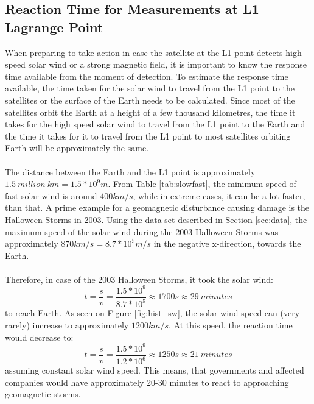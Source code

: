 \documentclass[12pt]{article}
\begin{document}
    \subsection{Reaction Time for Measurements at L1 Lagrange Point}
        When preparing to take action in case the satellite at the L1 point detects high speed solar wind or a strong magnetic field, it is important to know the response time available from the moment of detection. To estimate the response time available, the time taken for the solar wind to travel from the L1 point to the satellites or the surface of the Earth needs to be calculated. Since most of the satellites orbit the Earth at a height of a few thousand kilometres, the time it takes for the high speed solar wind to travel from the L1 point to the Earth and the time it takes for it to travel from the L1 point to most satellites orbiting Earth will be approximately the same.\\ \\
        The distance between the Earth and the L1 point is approximately $1.5\ million\ km = 1.5*10^9m$. From Table \ref{tab:slowfast}, the minimum speed of fast solar wind is around $400km/s$, while in extreme cases, it can be a lot faster, than that. A prime example for a geomagnetic disturbance causing damage is the Halloween Storms in 2003. Using the data set described in Section \ref{sec:data}, the maximum speed of the solar wind during the 2003 Halloween Storms was approximately $870km/s = 8.7*10^5m/s$ in the negative x-direction, towards the Earth.\\ \\
        Therefore, in case of the 2003 Halloween Storms, it took the solar wind:
        \begin{equation}
            t=\frac{s}{v}=\frac{1.5*10^9}{8.7*10^5}\approx 1700s\approx 29\ minutes
        \end{equation}
        to reach Earth. As seen on Figure \ref{fig:hist_sw}, the solar wind speed can (very rarely) increase to approximately $1200km/s$. At this speed, the reaction time would decrease to:
        \begin{equation}
            t=\frac{s}{v}=\frac{1.5*10^9}{1.2*10^6}\approx 1250s\approx 21\ minutes
        \end{equation}
        assuming constant solar wind speed. This means, that governments and affected companies would have approximately 20-30 minutes to react to approaching geomagnetic storms.
\end{document}

